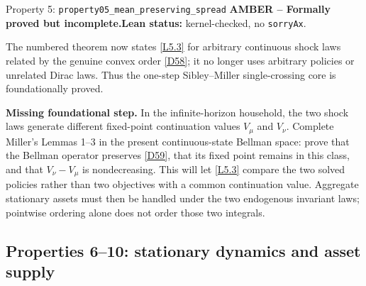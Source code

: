 \documentclass[11pt]{article}
\newcommand{\leanname}[1]{\nolinkurl{#1}}
\newcommand{\formalcheck}{\textbf{Lean status:} kernel-checked, no \texttt{sorryAx}.}
\newcommand{\missing}[1]{\par\smallskip\textbf{Missing foundational step.} #1}
\newcommand{\amberstatus}{\textcolor{conditional}{\textbf{AMBER -- Formally proved but incomplete.}}}
\begin{document}
\begin{amberbox}{Property 5: \leanname{property05_mean_preserving_spread}}
\amberstatus\quad\formalcheck

The numbered theorem now states \eqref{L5.3} for arbitrary continuous shock
laws related by the genuine convex order \eqref{D58}; it no longer uses
arbitrary policies or unrelated Dirac laws.  Thus the one-step
Sibley--Miller single-crossing core is foundationally proved.

\missing{In the infinite-horizon household, the two shock laws generate
different fixed-point continuation values $V_\mu$ and $V_\nu$.  Complete
Miller's Lemmas 1--3 in the present continuous-state Bellman space: prove
that the Bellman operator preserves \eqref{D59}, that its fixed point remains
in this class, and that $V_\nu-V_\mu$ is nondecreasing.  This will let
\eqref{L5.3} compare the two solved policies rather than two objectives with
a common continuation value.  Aggregate stationary assets must then be
handled under the two endogenous invariant laws; pointwise ordering alone
does not order those two integrals.}
\end{amberbox}

\subsection{Properties 6--10: stationary dynamics and asset supply}
\end{document}
